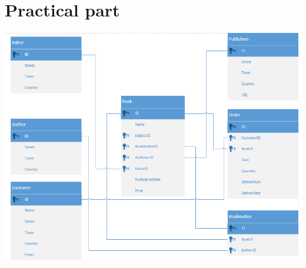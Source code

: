 \documentclass[•]{article}
\begin{document}
\section{Practical part}
\includegraphics[width=\textwidth]{UML-model.PNG}


\end{document}
